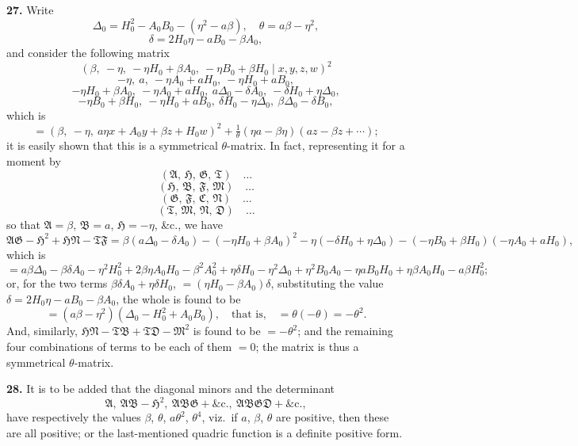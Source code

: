 \documentclass[11pt]{article}
\begin{document}
\medskip
\noindent\textbf{27.} Write
\[
\Delta_{0}=H_{0}^{2}-A_{0}B_{0}-(\eta^{2}-a\beta),\quad \theta=a\beta-\eta^{2},
\]
\[
\delta=2H_{0}\eta-aB_{0}-\beta A_{0},
\]
and consider the following matrix
\[
(\beta,\ -\eta,\ -\eta H_{0}+\beta A_{0},\ -\eta B_{0}+\beta H_{0} \mid x,y,z,w)^{2}
\]
\[
-\eta,\ a,\ -\eta A_{0}+aH_{0},\ -\eta H_{0}+aB_{0},
\]
\[
-\eta H_{0}+\beta A_{0},\ -\eta A_{0}+aH_{0},\ a\Delta_{0}-\delta A_{0},\ -\delta H_{0}+\eta\Delta_{0},
\]
\[
-\eta B_{0}+\beta H_{0},\ -\eta H_{0}+aB_{0},\ \delta H_{0}-\eta\Delta_{0},\ \beta\Delta_{0}-\delta B_{0},
\]
which is
\[
=(\beta,\ -\eta,\ a\eta x+A_{0}y+\beta z+H_{0}w)^{2}+\tfrac{1}{\theta}(\eta a-\beta\eta)(az-\beta z+\cdots);
\]
it is easily shown that this is a symmetrical $\theta$-matrix. In fact, representing it for a moment by
\[
(\mathfrak{A},\,\mathfrak{H},\,\mathfrak{G},\,\mathfrak{T})\quad\ldots
\]
\[
(\mathfrak{H},\,\mathfrak{B},\,\mathfrak{F},\,\mathfrak{M})\quad\ldots
\]
\[
(\mathfrak{G},\,\mathfrak{F},\,\mathfrak{C},\,\mathfrak{N})\quad\ldots
\]
\[
(\mathfrak{T},\,\mathfrak{M},\,\mathfrak{N},\,\mathfrak{D})\quad\ldots
\]
so that $\mathfrak{A}=\beta$, $\mathfrak{B}=a$, $\mathfrak{H}=-\eta$, \&c., we have
\[
\mathfrak{A}\mathfrak{G}-\mathfrak{H}^{2}+\mathfrak{H}\mathfrak{N}-\mathfrak{T}\mathfrak{F}=\beta(a\Delta_{0}-\delta A_{0})-(-\eta H_{0}+\beta A_{0})^{2}-\eta(-\delta H_{0}+\eta\Delta_{0})-(-\eta B_{0}+\beta H_{0})(-\eta A_{0}+aH_{0}),
\]
which is
\[
=a\beta\Delta_{0}-\beta\delta A_{0}-\eta^{2}H_{0}^{2}+2\beta\eta A_{0}H_{0}-\beta^{2}A_{0}^{2}+\eta\delta H_{0}-\eta^{2}\Delta_{0}+\eta^{2}B_{0}A_{0}-\eta aB_{0}H_{0}+\eta\beta A_{0}H_{0}-a\beta H_{0}^{2};
\]
or, for the two terms $\beta\delta A_{0}+\eta\delta H_{0}$, $=(\eta H_{0}-\beta A_{0})\delta$, substituting the value $\delta=2H_{0}\eta-aB_{0}-\beta A_{0}$, the whole is found to be
\[
=(a\beta-\eta^{2})(\Delta_{0}-H_{0}^{2}+A_{0}B_{0}),\quad\text{that is,}\quad =\theta(-\theta)=-\theta^{2}.
\]
And, similarly, $\mathfrak{H}\mathfrak{N}-\mathfrak{T}\mathfrak{B}+\mathfrak{T}\mathfrak{D}-\mathfrak{M}^{2}$ is found to be $=-\theta^{2}$; and the remaining four combinations of terms to be each of them $=0$; the matrix is thus a symmetrical $\theta$-matrix.

\medskip
\noindent\textbf{28.} It is to be added that the diagonal minors and the determinant
\[
\mathfrak{A},\ \mathfrak{A}\mathfrak{B}-\mathfrak{H}^{2},\ \mathfrak{A}\mathfrak{B}\mathfrak{G}+\&\mathrm{c.},\ \mathfrak{A}\mathfrak{B}\mathfrak{G}\mathfrak{D}+\&\mathrm{c.},
\]
have respectively the values $\beta$, $\theta$, $a\theta^{2}$, $\theta^{4}$, viz.\ if $a$, $\beta$, $\theta$ are positive, then these are all positive; or the last-mentioned quadric function is a definite positive form.
\end{document}
